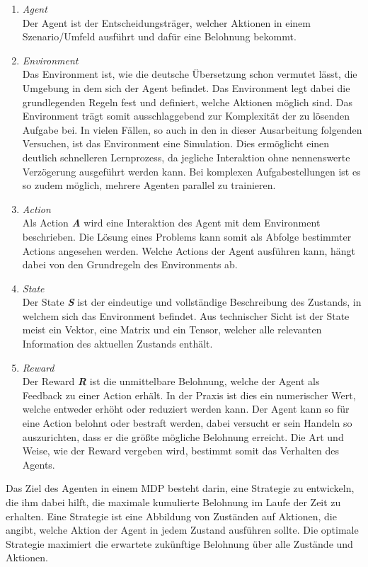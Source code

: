 \begin{enumerate}
    \begin{enumerate}
        \item \textit{Agent}\\
        Der Agent ist der Entscheidungsträger, welcher Aktionen in einem Szenario/Umfeld ausführt und dafür eine Belohnung bekommt.
        \item \textit{Environment}\\
        Das Environment ist, wie die deutsche Übersetzung schon vermutet lässt, die Umgebung in dem sich der Agent befindet. Das Environment legt dabei die grundlegenden Regeln fest und definiert, welche Aktionen möglich sind. Das Environment trägt somit ausschlaggebend zur Komplexität der zu lösenden Aufgabe bei. In vielen Fällen, so auch in den in dieser Ausarbeitung folgenden Versuchen, ist das Environment eine Simulation. Dies ermöglicht einen deutlich schnelleren Lernprozess, da jegliche Interaktion ohne nennenswerte Verzögerung ausgeführt werden kann. Bei komplexen Aufgabestellungen ist es so zudem möglich, mehrere Agenten parallel zu trainieren.
        \item \textit{Action}\\
        Als Action \textbf{\textit{A}} wird eine Interaktion des Agent mit dem Environment beschrieben. Die Lösung eines Problems kann somit als Abfolge bestimmter Actions angesehen werden. Welche Actions der Agent ausführen kann, hängt dabei von den Grundregeln des Environments ab.
        \item \textit{State}\\
        Der State \textbf{\textit{S}} ist der eindeutige und vollständige Beschreibung des Zustands, in welchem sich das Environment befindet. Aus technischer Sicht ist der State meist ein Vektor, eine Matrix und ein Tensor, welcher alle relevanten Information des aktuellen Zustands enthält.
        \item \textit{Reward}\\
        Der Reward \textbf{\textit{R}} ist die unmittelbare Belohnung, welche der Agent als Feedback zu einer Action erhält. In der Praxis ist dies ein numerischer Wert, welche entweder erhöht oder reduziert werden kann. Der Agent kann so für eine Action belohnt oder bestraft werden, dabei versucht er sein Handeln so auszurichten, dass er die größte mögliche Belohnung erreicht. Die Art und Weise, wie der Reward vergeben wird, bestimmt somit das Verhalten des Agents.
    \end{enumerate}

    Das Ziel des Agenten in einem MDP besteht darin, eine Strategie zu entwickeln, die ihm dabei hilft, die maximale kumulierte Belohnung im Laufe der Zeit zu erhalten. Eine Strategie ist eine Abbildung von Zuständen auf Aktionen, die angibt, welche Aktion der Agent in jedem Zustand ausführen sollte. Die optimale Strategie maximiert die erwartete zukünftige Belohnung über alle Zustände und Aktionen.
    

\end{enumerate}
